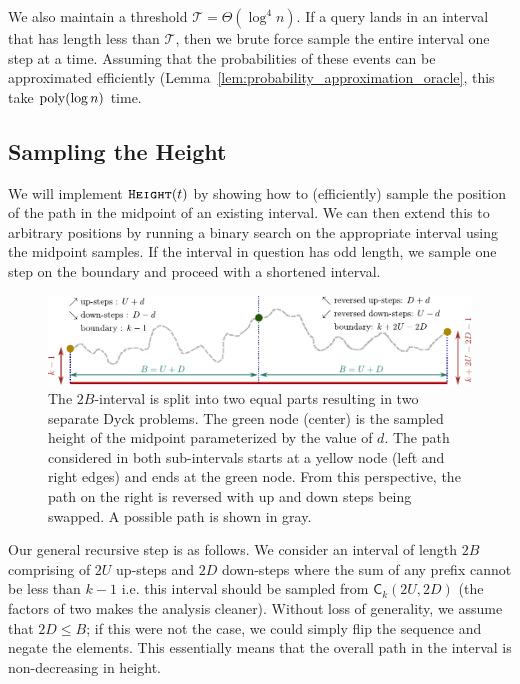 We also maintain a threshold $\mathcal T = \Theta(\log^4 n)$.
If a query lands in an interval that has length less than $\mathcal T$, then we brute force sample the entire interval one step at a time.
Assuming that the probabilities of these events can be approximated efficiently (Lemma~\ref{lem:probability_approximation_oracle},
this take $\mathrm{poly}(\log n)$ time.



\subsection{Sampling the Height}
We will implement $\texttt{\textsc{Height}}(t)$ by showing how to (efficiently) sample the position of the path in the midpoint of an existing interval.
We can then extend this to arbitrary positions by running a binary search on the appropriate interval using the midpoint samples.
If the interval in question has odd length, we sample one step on the boundary and proceed with a shortened interval.
\begin{figure}[htpb]
    \centering
    \includegraphics[width=\textwidth]{images/dyck_height_sampling.pdf}
    \caption{The $2B$-interval is split into two equal parts resulting in two separate Dyck problems.
             The green node (center) is the sampled height of the midpoint parameterized by the value of $d$.
             The path considered in both sub-intervals starts at a yellow node (left and right edges) and ends at the green node.
             From this perspective, the path on the right is reversed with up and down steps being swapped.
             A possible path is shown in gray.}
    \label{fig:dyck_height_sampling}
\end{figure}

Our general recursive step is as follows.
We consider an interval of length $2B$ comprising of $2U$ up-steps and $2D$ down-steps where the sum of any prefix cannot be less than $k-1$
i.e. this interval should be sampled from $\mathsf C_k(2U,2D)$ (the factors of two makes the analysis cleaner).
Without loss of generality, we assume that $2D\le B$; if this were not the case, we could simply flip the sequence and negate the elements.
This essentially means that the overall path in the interval is non-decreasing in height.

